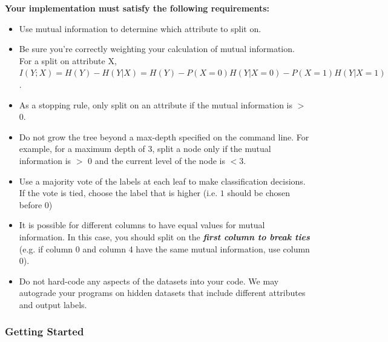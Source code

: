\documentclass[11pt,addpoints,answers]{exam}
\begin{document}
\clearpage
\textbf{Your implementation must satisfy the following requirements:}
\begin{itemize}
\item Use mutual information to determine which attribute to split on.
\item Be sure you’re correctly weighting your calculation of mutual information. For a split on attribute X, $I(Y;X) = H(Y)-H(Y|X) = H(Y) - P(X=0)H(Y|X = 0) - P(X = 1)H(Y|X = 1)$.
\item As a stopping rule, only split on an attribute if the mutual information is $>$ 0. 
\item Do not grow the tree beyond a max-depth specified on the command line. For example, for a maximum depth of 3, split a node only if the mutual information is $>$ 0 and the current level of the node is $< 3$.
\item Use a majority vote of the labels at each leaf to make classification decisions. If the vote is tied, choose the label that is higher (i.e. $1$ should be chosen before $0$)
\item It is possible for different columns to have equal values for mutual information. In this case, you should split on the \emph{\textbf{first column to break ties}} (e.g. if column 0 and column 4 have the same mutual information, use column 0).
\item Do not hard-code any aspects of the datasets into your code. We may autograde your programs on hidden datasets that include different attributes and output labels.
\end{itemize}

\subsubsection{Getting Started}
\end{document}

